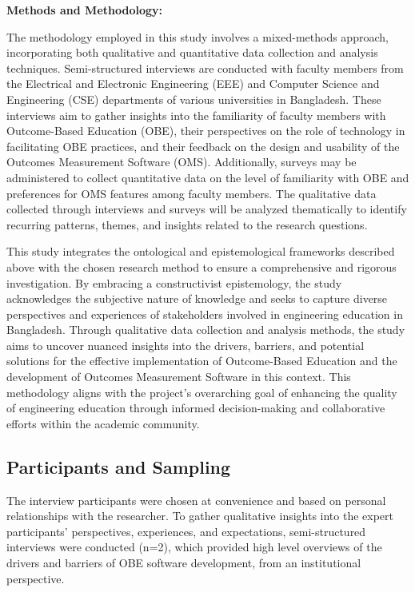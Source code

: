 \documentclass[journal,onecolumn]{IEEEtran}
\begin{document}
\textbf{Methods and Methodology:}


The methodology employed in this study involves a mixed-methods approach, incorporating both qualitative and quantitative data collection and analysis techniques. Semi-structured interviews are conducted with faculty members from the Electrical and Electronic Engineering (EEE) and Computer Science and Engineering (CSE) departments of various universities in Bangladesh. These interviews aim to gather insights into the familiarity of faculty members with Outcome-Based Education (OBE), their perspectives on the role of technology in facilitating OBE practices, and their feedback on the design and usability of the Outcomes Measurement Software (OMS). Additionally, surveys may be administered to collect quantitative data on the level of familiarity with OBE and preferences for OMS features among faculty members. The qualitative data collected through interviews and surveys will be analyzed thematically to identify recurring patterns, themes, and insights related to the research questions.


This study integrates the ontological and epistemological frameworks described above with the chosen research method to ensure a comprehensive and rigorous investigation. By embracing a constructivist epistemology, the study acknowledges the subjective nature of knowledge and seeks to capture diverse perspectives and experiences of stakeholders involved in engineering education in Bangladesh. Through qualitative data collection and analysis methods, the study aims to uncover nuanced insights into the drivers, barriers, and potential solutions for the effective implementation of Outcome-Based Education and the development of Outcomes Measurement Software in this context. This methodology aligns with the project's overarching goal of enhancing the quality of engineering education through informed decision-making and collaborative efforts within the academic community.




\subsection{Participants and Sampling}
The interview participants were chosen at convenience and based on personal relationships with the researcher. To gather qualitative insights into the expert participants’ perspectives, experiences, and expectations, semi-structured interviews were conducted (n=2), which provided high level overviews of the drivers and barriers of OBE software development, from an institutional perspective. 
\end{document}
